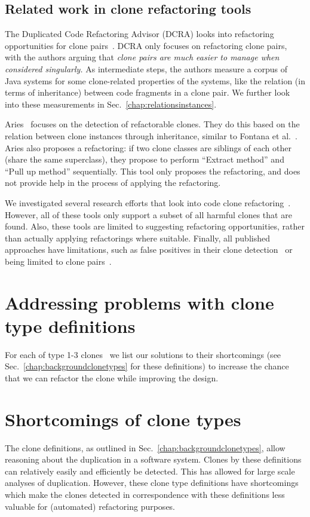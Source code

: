 \documentclass[a4paper]{article}
\begin{document}
\subsection{Related work in clone refactoring tools}
The Duplicated Code Refactoring Advisor (DCRA) looks into refactoring opportunities for clone pairs~\cite{fontana2012duplicated, fontana2015duplicated}. DCRA only focuses on refactoring clone pairs, with the authors arguing that \textit{clone pairs are much easier to manage when considered singularly.} As intermediate steps, the authors measure a corpus of Java systems for some clone-related properties of the systems, like the relation (in terms of inheritance) between code fragments in a clone pair. We further look into these measurements in Sec.~\ref{chap:relationsinstances}.

Aries~\cite{higo2004aries, higo2008metric} focuses on the detection of refactorable clones. They do this based on the relation between clone instances through inheritance, similar to Fontana et al.~\cite{fontana2012duplicated}. Aries also proposes a refactoring: if two clone classes are siblings of each other (share the same superclass), they propose to perform ``Extract method'' and ``Pull up method'' sequentially. This tool only proposes the refactoring, and does not provide help in the process of applying the refactoring.

We investigated several research efforts that look into code clone refactoring~\cite{alwaqfi2017refactoring, chen2018clone, koni2001scenario}. However, all of these tools only support a subset of all harmful clones that are found. Also, these tools are limited to suggesting refactoring opportunities, rather than actually applying refactorings where suitable. Finally, all published approaches have limitations, such as false positives in their clone detection~\cite{chen2018clone} or being limited to clone pairs~\cite{higo2008metric}.

\section{Addressing problems with clone type definitions}\label{chap:clonetypes}
For each of type 1-3 clones~\cite{roy2007survey} we list our solutions to their shortcomings (see Sec.~\ref{chap:backgroundclonetypes} for these definitions) to increase the chance that we can refactor the clone while improving the design.

\section{Shortcomings of clone types}
The clone definitions, as outlined in Sec.~\ref{chap:backgroundclonetypes}, allow reasoning about the duplication in a software system. Clones by these definitions can relatively easily and efficiently be detected. This has allowed for large scale analyses of duplication. However, these clone type definitions have shortcomings which make the clones detected in correspondence with these definitions less valuable for (automated) refactoring purposes.
\end{document}
